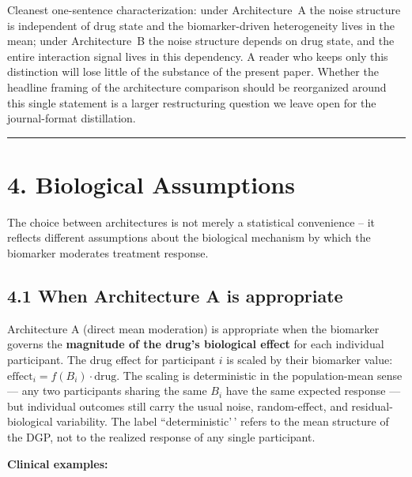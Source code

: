 \documentclass[
]{article}
\begin{document}
\textcolor{addblue}{Cleanest one-sentence characterization: under Architecture~A the noise structure is independent of drug state and the biomarker-driven heterogeneity lives in the mean; under Architecture~B the noise structure depends on drug state, and the entire interaction signal lives in this dependency. A reader who keeps only this distinction will lose little of the substance of the present paper. Whether the headline framing of the architecture comparison should be reorganized around this single statement is a larger restructuring question we leave open for the journal-format distillation.}

\bigskip\noindent

\rule{\textwidth}{0.4pt}\bigskip

\section{4. Biological Assumptions}

The choice between architectures is not merely a statistical
convenience -- it reflects different assumptions about the
biological mechanism by which the biomarker moderates treatment
response.

\subsection{4.1 When Architecture A is appropriate}

Architecture A (direct mean moderation) is appropriate when the
biomarker governs the \textbf{magnitude of the drug's biological
effect} for each individual participant. The drug effect for
participant \(i\) is scaled by their biomarker value:
\(\text{effect}_i = f(B_i) \cdot \text{drug}\). The scaling is
deterministic in the population-mean sense --- any two
participants sharing the same \(B_i\) have the same expected
response --- but individual outcomes still carry the usual noise,
random-effect, and residual-biological variability. The label
``deterministic'\,' refers to the mean structure of the DGP, not to
the realized response of any single participant.

\textbf{Clinical examples:}
\end{document}
